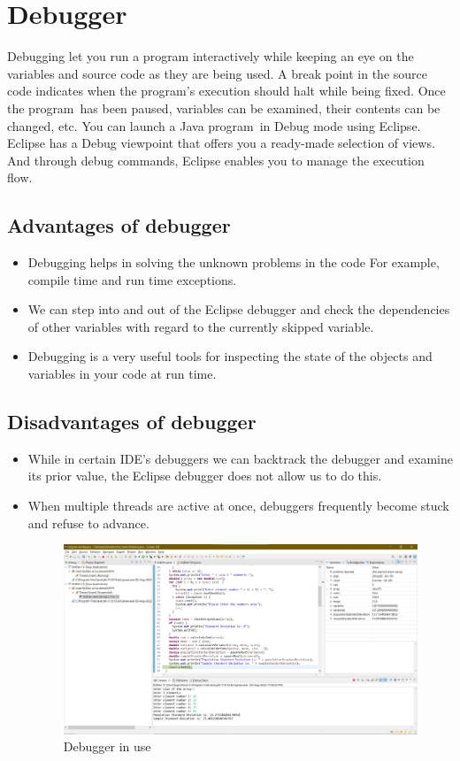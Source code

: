 \documentclass[a4paper, 12pt]{article}
\begin{document}
\newpage
\section{Debugger}
Debugging let you run a program interactively while keeping an eye on the variables and source code as they are being used. A break point in the source code indicates when the program's execution should halt while being fixed. Once the program has been paused, variables can be examined, their contents can be changed, etc. You can launch a Java program in Debug mode using Eclipse. Eclipse has a Debug viewpoint that offers you a ready-made selection of views. And through debug commands, Eclipse enables you to manage the execution flow.
\subsection{Advantages of debugger}
\begin{itemize}
    \item Debugging helps in solving the unknown problems in the code For example, compile time and run time exceptions.
    \item We can step into and out of the Eclipse debugger and check the dependencies of other variables with regard to the currently skipped variable.
    \item Debugging is a very useful tools for inspecting the state of the objects and variables in your code at run time.
\end{itemize}
\subsection{Disadvantages of debugger}
\begin{itemize}
    \item While in certain IDE's debuggers we can backtrack the debugger and examine its prior value, the Eclipse debugger does not allow us to do this.
    \item When multiple threads are active at once, debuggers frequently become stuck and refuse to advance.\\
    
\begin{figure}[h]
    \centering
    \includegraphics[width=0.90\linewidth]{Images/Debugger.jpg}
    \caption{Debugger in use}
    \label{fig:Debugger Image}
\end{figure}
\end{itemize}
\end{document}
